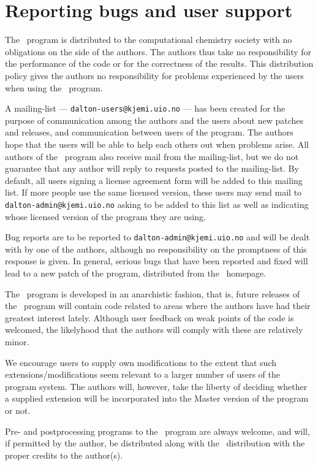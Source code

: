 \section{Reporting bugs and user support}

The \siraba\ program is distributed to the computational chemistry
society with no obligations on the side of the
authors. The authors thus take no responsibility
for the performance
of the code or for the correctness of the
results. This distribution
policy gives the authors no responsibility for problems experienced by
the users when using the \siraba\ program.

A mailing-list ---
\verb|dalton-users@kjemi.uio.no| --- has been created for
the purpose of communication among the authors and the users about
new patches and releases, and communication between users of the
program. The authors hope that the
users will be able to help each others out when problems
arise. All authors of the \siraba\ program also receive mail from the
mailing-list, but we do not guarantee that any author will reply to
requests posted to the mailing-list. By default, all users signing a
license agreement form will be added to this mailing list. If more
people use the same licensed version, these users may send mail to
\verb|dalton-admin@kjemi.uio.no| asking to be added to this list as
well as indicating whose licensed version of the program they are using.

Bug reports are to be reported to \verb|dalton-admin@kjemi.uio.no| and
will be dealt with by one of the authors, although no responsibility
on the promptness of this response is given. In general, serious bugs
that have been
reported and fixed will lead to a new patch of the program, distributed from the
\siraba\ homepage.

The \siraba\ program is developed in an anarchistic fashion, that is,
future releases of the \siraba\ program will contain code related to
areas where the authors have had their greatest interest
lately. Although user feedback on weak points of the code is welcomed, the
likelyhood that the authors will comply with these are relatively
minor.

We encourage users to supply own modifications to
the extent that
such extensions/modifications seem relevant to a larger number of
users of the program system. The authors will, however, take the
liberty of deciding whether a supplied extension will be incorporated
into the Master version of the program or not.

Pre- and postprocessing programs to the \siraba\ program are always
welcome, and will, if permitted by the author, be distributed along
with the \siraba\ distribution with the proper credits to the
author(s).
